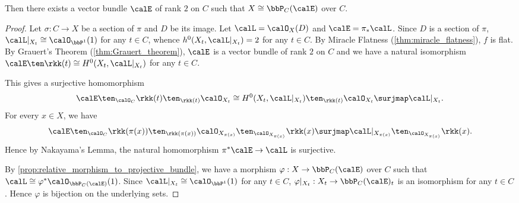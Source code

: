     \begin{proposition}\label{prop:ruled_surface_as_projective_bundle}
        Then there exists a vector bundle \(\calE\) of rank \(2\) on \(C\) such that \(X \cong \bbP_C(\calE)\) over \(C\).
    \end{proposition}
    \begin{proof}
        Let \(\sigma:C \to X\) be a section of \(\pi\) and \(D\) be its image.
        Let \(\calL = \calO_X(D)\) and \(\calE = \pi_*\calL\).
        Since \(D\) is a section of \(\pi\), \(\calL|_{X_t} \cong \calO_{\bbP^1}(1)\) for any \(t \in C\), whence \(h^0(X_t,\calL|_{X_t}) = 2\) for any \(t \in C\).
        By Miracle Flatness (\cref{thm:miracle_flatness}), \(f\) is flat.
        By Grauert's Theorem (\cref{thm:Grauert_theorem}), \(\calE\) is a vector bundle of rank \(2\) on \(C\) and we have a natural isomorphism \(\calE \ten \rkk(t) \cong H^0(X_t,\calL|_{X_t})\) for any \(t \in C\).

        This gives a surjective homomorphism 
        \[ \calE \ten_{\calO_C} \rkk(t) \ten_{\rkk(t)} \calO_{X_t} \cong H^0(X_t,\calL|_{X_t}) \ten_{\rkk(t)} \calO_{X_t} \surjmap \calL|_{X_t}. \]
        For every \(x \in X\), we have 
        \[ \calE \ten_{\calO_C} \rkk(\pi(x)) \ten_{\rkk(\pi(x))} \calO_{X_{\pi(x)}} \ten_{\calO_{X_{\pi(x)}}} \rkk(x)  \surjmap \calL|_{X_{\pi(x)}}\ten_{\calO_{X_{\pi(x)}}} \rkk(x). \]
        Hence by Nakayama's Lemma, the natural homomorphism \(\pi^*\calE \to \calL\) is surjective.

        By \cref{prop:relative_morphism_to_projective_bundle}, we have a morphism \(\varphi:X \to \bbP_C(\calE)\) over \(C\) such that \(\calL \cong \varphi^*\calO_{\bbP_C(\calE)}(1)\).
        Since \(\calL|_{X_t} \cong \calO_{\bbP^1}(1)\) for any \(t \in C\), \(\varphi|_{X_t}:X_t \to \bbP_C(\calE)_t\) is an isomorphism for any \(t \in C\).
        Hence \(\varphi\) is bijection on the underlying sets.
    \end{proof}


